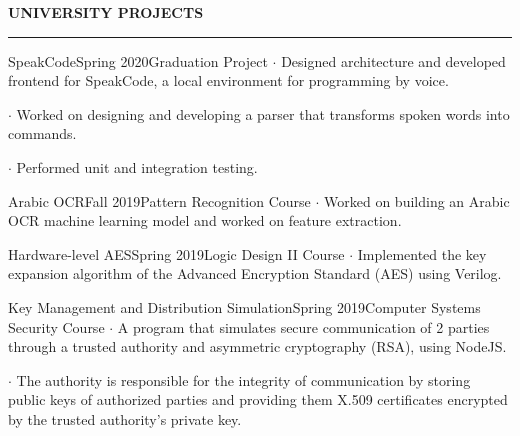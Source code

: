 \noindent\textcolor{themecolor}{\textbf{UNIVERSITY PROJECTS}}

\vspace{2mm}
\hrule
\vspace{3mm}

\begin{verbose}{SpeakCode}{Spring 2020}{Graduation Project}
    \noindent $\cdot$ Designed architecture and developed frontend for SpeakCode, a local environment for programming by voice.

    \noindent $\cdot$ Worked on designing and developing a parser that transforms spoken words into commands.

    \noindent $\cdot$ Performed unit and integration testing.
\end{verbose}

\vspace{3mm}

\begin{verbose}{Arabic OCR}{Fall 2019}{Pattern Recognition Course}
    \noindent $\cdot$ Worked on building an Arabic OCR machine learning model and worked on feature extraction.
\end{verbose}

\vspace{3mm}

\begin{verbose}{Hardware-level AES}{Spring 2019}{Logic Design II Course}
    \noindent $\cdot$ Implemented the key expansion algorithm of the Advanced Encryption Standard (AES) using Verilog.
\end{verbose}

\vspace{3mm}

\begin{verbose}{Key Management and Distribution Simulation}{Spring 2019}{Computer Systems Security Course}
    \noindent $\cdot$ A program that simulates secure communication of 2 parties through a trusted authority and asymmetric cryptography (RSA), using NodeJS.

    \noindent $\cdot$ The authority is responsible for the integrity of communication by storing public keys of authorized parties and providing them X.509 certificates encrypted by the trusted authority's private key.
\end{verbose}

\vspace{3mm}

